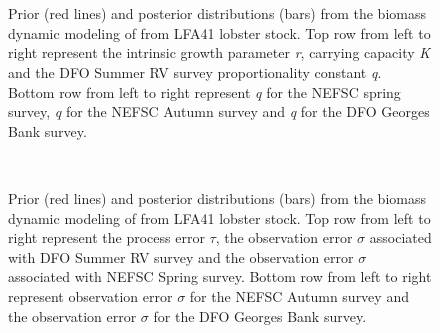 \documentclass[11pt]{article}
\newcommand{\D}{.}
\newcommand{\spm}{/backup/bio_data/bio.lobster/spmodelling/lfa41/}
\begin{document}
\begin{landscape}




\begin{figure}
\centering
        \\
        \\
        \caption{Prior (red lines) and posterior distributions (bars) from the biomass dynamic modeling of from LFA41 lobster stock. Top row from left to right represent the intrinsic growth parameter \emph{r}, carrying capacity \emph{K} and the DFO Summer RV survey proportionality constant \emph{q}. Bottom row from left to right represent \emph{q} for the NEFSC spring survey, \emph{q} for the NEFSC Autumn survey and \emph{q} for the DFO Georges Bank survey. }
        
\end{figure}
     \clearpage


\begin{figure}
\centering
        \\
         \caption{Prior (red lines) and posterior distributions (bars) from the biomass dynamic modeling of from LFA41 lobster stock. Top row from left to right represent the process error $\tau$, the observation error $\sigma$ associated with DFO Summer RV survey and the observation error $\sigma$ associated with NEFSC Spring survey. Bottom row from left to right represent observation error $\sigma$ for the NEFSC Autumn survey and the observation error $\sigma$ for the DFO Georges Bank survey. }
       

\end{figure}
\end{landscape}
\end{document}
